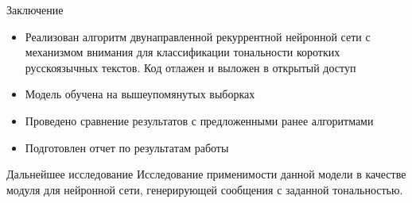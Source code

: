 \documentclass{beamer}
\begin{document}
\begin{frame}{Заключение}

	\begin{itemize}
		\item Реализован алгоритм двунаправленной рекуррентной нейронной сети с механизмом внимания для классификации тональности коротких русскоязычных текстов. Код отлажен и выложен в открытый доступ
		\item Модель обучена на вышеупомянутых выборках
		\item Проведено сравнение результатов с предложенными ранее алгоритмами
		\item Подготовлен отчет по результатам работы
	\end{itemize}

	\begin{block}{Дальнейшее исследование}
		Исследование применимости данной модели в качестве модуля для нейронной сети, генерирующей сообщения с заданной тональностью.
	\end{block}
\end{frame}
\end{document}
